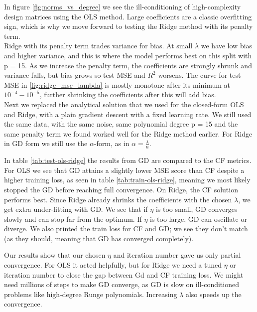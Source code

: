 \documentclass[amssymb,twocolumn,aps]{revtex4-2}
\begin{document}
In figure \ref{fig:norms_vs_degree} we see the ill-conditioning of high-complexity design matrices using the OLS method. Large coefficients are a classic overfitting sign, which is why we move forward to testing the Ridge method with its penalty term. \\

Ridge with its penalty term trades variance for bias. At small $\lambda$ we have low bias and higher variance, and this is where the model performs best on this split with p = 15. As we increase the penalty term, the coefficients are strongly shrunk and variance falls, but bias grows so test MSE and $R^2$ worsens. The curve for test MSE in \ref{fig:ridge_mse_lambda} is mostly monotone after its minimum at $10^{-4}-10^{-5}$, further shrinking the coefficients after this will add bias. \\

Next we replaced the analytical solution that we used for the closed-form OLS and Ridge, with a plain gradient descent with a fixed learning rate. We still used the same data, with the same noise, same polynomial degree p = 15 and the same penalty term we found worked well for the Ridge method earlier. For Ridge in GD form we still use the $\alpha$-form, as in $\alpha=\frac{\lambda}{n}$. 

In table \ref{tab:test-ols-ridge} the results from GD are compared to the CF metrics. For OLS we see that GD attains a slightly lower MSE score than CF despite a higher training loss, as seen in table \ref{tab:train-ols-ridge}, meaning we most likely stopped the GD before reaching full convergence. On Ridge, the CF solution performs best. Since Ridge already shrinks the coefficients with the chosen $\lambda$, we get extra under-fitting with GD. We see that if $\eta$ is too small, GD converges slowly and can stop far from the optimum. If $\eta$ is too large, GD can oscillate or diverge. We also printed the train loss for CF and GD; we see they don't match (as they should, meaning that GD has converged completely).

Our results show that our chosen $\eta$ and iteration number gave us only partial convergence. For OLS it acted helpfully, but for Ridge we need a tuned $\eta$ or iteration number to close the gap between Gd and CF training loss. We might need millions of steps to make GD converge, as GD is slow on ill-conditioned problems like high-degree Runge polynomials. Increasing $\lambda$ also speeds up the convergence. 
\end{document}
